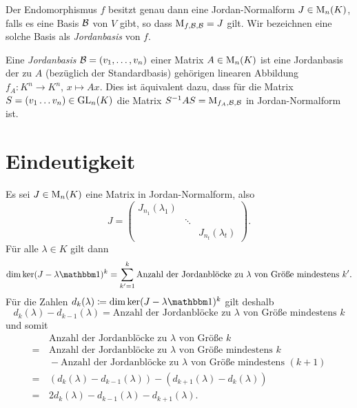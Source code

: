 Der Endomorphismus $f$ besitzt genau dann eine Jordan-Normalform $J \in \operatorname{M}_{n}(K)$, falls es eine Basis $\mathcal{B}$ von $V$ gibt, so dass $\operatorname{M}_{f, \mathcal{B}, \mathcal{B}} = J$ gilt.
Wir bezeichnen eine solche Basis als \emph{Jordanbasis} von $f$.

Eine \emph{Jordanbasis} $\mathcal{B} = (v_1, \dotsc, v_n)$ einer Matrix $A \in \operatorname{M}_{n}(K)$ ist eine Jordanbasis der zu $A$ (bezüglich der Standardbasis) gehörigen linearen Abbildung $f_A \colon K^n \to K^n$, $x \mapsto Ax$.
Dies ist äquivalent dazu, dass für die Matrix $S = (v_1 \dotsc v_n) \in \operatorname{GL}_{n}(K)$ die Matrix $S^{-1} A S = \operatorname{M}_{f_A, \mathcal{B}, \mathcal{B}}$ in Jordan-Normalform ist.





\section{Eindeutigkeit}

Es sei $J \in \operatorname{M}_{n}(K)$ eine Matrix in Jordan-Normalform, also
\[
    J
  = \begin{pmatrix}
      J_{n_1}(\lambda_1)  &         &                     \\
                          & \ddots  &                     \\
                          &         & J_{n_t}(\lambda_t)
    \end{pmatrix}.
\]
Für alle $\lambda \in K$ gilt dann
\[
    \dim \ker (J - \lambda \Id)^k
  = \sum_{k'=1}^k \text{Anzahl der Jordanblöcke zu $\lambda$ von Größe mindestens $k'$}.
\]
Für die Zahlen $d_k(\lambda) \coloneqq \dim \ker (J - \lambda \Id)^k$ gilt deshalb
\[
    d_k(\lambda) - d_{k-1}(\lambda)
  = \text{Anzahl der Jordanblöcke zu $\lambda$ von Größe mindestens $k$}
\]
und somit
\begin{align*}
     &\,    \text{Anzahl der Jordanblöcke zu $\lambda$ von Größe $k$}                 \\
    =&\,    \text{Anzahl der Jordanblöcke zu $\lambda$ von Größe mindestens $k$}      \\
     &\,  - \text{Anzahl der Jordanblöcke zu $\lambda$ von Größe mindestens $(k+1)$}  \\
    =&\,    ( d_k(\lambda) - d_{k-1}(\lambda) )
          - ( d_{k+1}(\lambda) - d_k(\lambda) )                                       \\
    =&\,  2 d_k(\lambda) - d_{k-1}(\lambda) - d_{k+1}(\lambda).
\end{align*}

